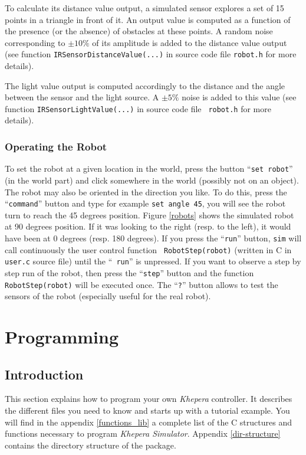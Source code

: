 \documentclass[a4paper,twoside]{article}
\begin{document}
To calculate its distance value output, a simulated sensor explores a set of
15 points in a triangle in front of it. An output value is computed as a
function of the presence (or the absence) of obstacles at these points. A
random noise corresponding to $\pm 10\% $ of its amplitude is added to the
distance value output (see function {\tt IRSensorDistanceValue(...)} in source
code file {\tt robot.h} for more details).

The light value output is computed accordingly to the distance and the angle
between the sensor and the light source. A $\pm 5\% $ noise is added to this
value (see function {\tt IRSensorLightValue(...)} in source code file {\tt
robot.h} for more details).

\subsubsection{Operating the Robot}

To set the robot at a given location in the world, press the button
``{\tt set robot}'' (in the world part) and click somewhere in the world
(possibly not on an object). The robot may also be oriented in the direction
you like. To do this, press the ``{\tt command}'' button and type for example
{\tt set angle 45}, you will see the robot turn to reach the 45 degrees
position. Figure \ref{robots} shows the simulated robot at 90 degrees
position. If it was looking to the right (resp. to the left), it would have
been at 0 degrees (resp. 180 degrees). If you press the ``{\tt run}'' button,
{\tt sim} will call continuously the user control function {\tt
RobotStep(robot)} (written in C in {\tt user.c} source file) until the ``{\tt
run}'' is unpressed. If you want to observe a step by step run of the robot,
then press the ``{\tt step}'' button and the function {\tt RobotStep(robot)}
will be executed once. The ``{\tt ?}'' button allows to test the sensors of
the robot (especially useful for the real robot).

\section{Programming}

\subsection{Introduction}

This section explains how to program your own {\em Khepera} controller. It
describes the different files you need to know and starts up with a tutorial
example. You will find in the appendix \ref{functions_lib} a complete list of
the C structures and functions necessary to program {\em Khepera Simulator}.
Appendix \ref{dir-structure} contains the directory structure of the package.
\end{document}
